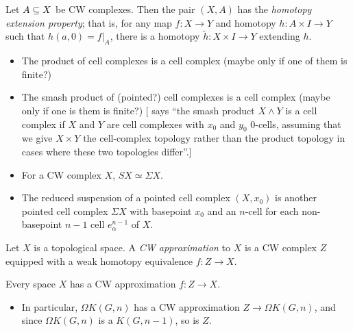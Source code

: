 \documentclass{MetricNotes2023}
\def\subq{\ensuremath\subseteq}
\begin{document}
\begin{lemma}\label{2502211419}
Let \(A\subq X\) be CW complexes. Then the pair \((X, A)\) has the \textit{homotopy extension property}; that is, for any map \(f : X \to Y\) and homotopy \(h : A\times I \to Y\) such that \(h(a,0)=f|_A\), there is a homotopy \(\widetilde h : X\times I \to Y\) extending \(h\). 
\end{lemma}

\begin{itemize}
\item The product of cell complexes is a cell complex (maybe only if one of them is finite?)
\item The smash product of (pointed?) cell complexes is a cell complex (maybe only if one is them is finite?) [\autocite{hatcher} says ``the smash product \(X\wedge Y\) is a cell complex if \(X\) and \(Y\) are cell complexes with \(x_0\) and \(y_0\) \(0\)-cells, assuming that we give \(X\times Y\) the cell-complex topology rather than the product topology in cases where these two topologies differ''.]
\item For a CW complex \(X\), \(SX\simeq \Sigma X\).
\item The reduced suspension of a pointed cell complex \((X, x_0)\) is another pointed cell complex \(\Sigma X\) with basepoint \(x_0\) and an \(n\)-cell for each non-basepoint \(n-1\) cell \(e^{n-1}_\alpha\) of \(X\).
\end{itemize}

\begin{definition}
Let \(X\) is a topological space. A \textit{CW approximation} to \(X\) is a CW complex \(Z\) equipped with a weak homotopy equivalence \(f : Z \to X\).
\end{definition}

\begin{theorem}
Every space \(X\) has a CW approximation \(f : Z \to X\). %
\end{theorem}

\begin{itemize}
\item In particular, \(\Omega K(G, n)\) has a CW approximation \(Z \to \Omega K(G, n)\), and since \(\Omega K(G,n)\) is a \(K(G,n-1)\), so is \(Z\). 
\end{itemize}
\end{document}
